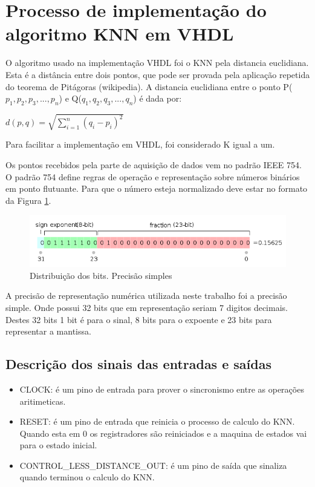 \documentclass[12pt]{article}
\begin{document}
\section{Processo de implementação do algoritmo KNN em VHDL}

O algoritmo usado na implementação VHDL foi o KNN pela distancia euclidiana. Esta é a distância entre dois pontos, 
que pode ser provada pela aplicação repetida do teorema de Pitágoras (wikipedia). A distancia euclidiana entre o ponto 
P($p_1, p_2, p_3, ..., p_n$) e Q($q_1, q_2, q_3, ..., q_n$) é dada por:

$d(p, q) = \sqrt{\sum\limits_{i=1}^n (q_i - p_i)^2}$

Para facilitar a implementação em VHDL, foi considerado K igual a um. 

Os pontos recebidos pela parte de aquisição de dados vem no padrão IEEE 754. O padrão 754 define regras de operação e 
representação sobre números binários em ponto flutuante. Para que o número esteja normalizado deve estar no formato da 
Figura \ref{fig:ieee754ps}.

\begin{figure}[ht]
\centering
\includegraphics[width=.5\textwidth]{img/IEEE_754_Single_Floating_Point_Format}
\caption{Distribuição dos bits. Precisão simples \cite{wiki:ieee754en}}
\label{fig:ieee754ps}
\end{figure}

A precisão de representação numérica utilizada neste trabalho foi a precisão simple. Onde possui 32 bits 
que em representação seriam 7 digitos decimais. Destes 32 bits 1 bit é para o sinal, 8 bits para o expoente
e 23 bits para representar a mantissa.

\subsection{Descrição dos sinais das entradas e saídas}

\begin{itemize}
\item CLOCK: é um pino de entrada para prover o sincronismo entre as operações aritimeticas.

\item RESET: é um pino de entrada que reinicia o processo de calculo do KNN. Quando esta em 0 os 
registradores são reiniciados e a maquina de estados vai para o estado inicial.

\item CONTROL\_LESS\_DISTANCE\_OUT: é um pino de saída que sinaliza quando terminou o calculo do KNN.
\end{itemize}
\end{document}
